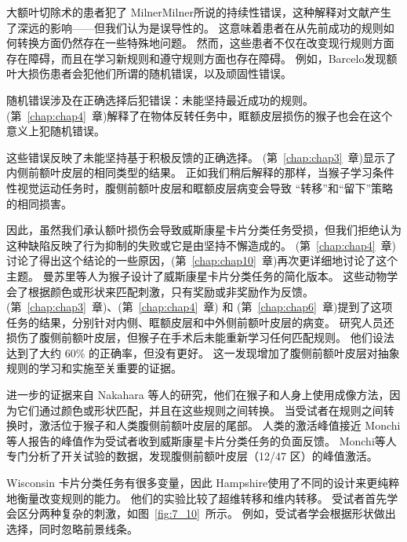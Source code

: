 大额叶切除术的患者犯了 MilnerMilner\cite{milner1963effects}所说的持续性错误，这种解释对文献产生了深远的影响——但我们认为是误导性的。 
这意味着患者在从先前成功的规则如何转换方面仍然存在一些特殊地问题。 
然而，这些患者不仅在改变现行规则方面存在障碍，而且在学习新规则和遵守规则方面也存在障碍。 
例如，Barcelo\cite{barcelo2002both}发现额叶大损伤患者会犯他们所谓的随机错误，以及顽固性错误。
\par


随机错误涉及在正确选择后犯错误：未能坚持最近成功的规则。 
(第~\ref{chap:chap4}~章)解释了在物体反转任务中，眶额皮层损伤的猴子也会在这个意义上犯随机错误\cite{rudebeck2008frontal}。
\par


这些错误反映了未能坚持基于积极反馈的正确选择。 (第~\ref{chap:chap3}~章)显示了内侧前额叶皮层的相同类型的结果。 
正如我们稍后解释的那样，当猴子学习条件性视觉运动任务时，腹侧前额叶皮层和眶额皮层病变会导致
“转移”和“留下”策略的相同损害\cite{bussey2001role}。
\par


因此，虽然我们承认额叶损伤会导致威斯康星卡片分类任务受损，但我们拒绝认为这种缺陷反映了行为抑制的失败或它是由坚持不懈造成的。 
(第~\ref{chap:chap4}~章)讨论了得出这个结论的一些原因，(第~\ref{chap:chap10}~章)再次更详细地讨论了这个主题。 
曼苏里等人\cite{mansouri2006prefrontal}为猴子设计了威斯康星卡片分类任务的简化版本。 
这些动物学会了根据颜色或形状来匹配刺激，只有奖励或非奖励作为反馈。 
(第~\ref{chap:chap3}~章)、(第~\ref{chap:chap4}~章) 和 (第~\ref{chap:chap6}~章)提到了这项任务的结果，分别针对内侧、眶额皮层和中外侧前额叶皮层的病变\cite{buckley2009dissociable}。
研究人员还损伤了腹侧前额叶皮层，但猴子在手术后未能重新学习任何匹配规则。
他们设法达到了大约 60\% 的正确率，但没有更好。
这一发现增加了腹侧前额叶皮层对抽象规则的学习和实施至关重要的证据。
\par


进一步的证据来自 Nakahara 等人的研究\cite{nakahara2002functional}，他们在猴子和人身上使用成像方法，因为它们通过颜色或形状匹配，并且在这些规则之间转换。 
当受试者在规则之间转换时，激活位于猴子和人类腹侧前额叶皮层的尾部。 
人类的激活峰值接近 Monchi 等人报告的峰值\cite{monchi2001wisconsin}作为受试者收到威斯康星卡片分类任务的负面反馈。
Monchi等人专门分析了开关试验的数据，发现腹侧前额叶皮层（12/47 区）的峰值激活。
\par


Wisconsin 卡片分类任务有很多变量，因此 Hampshire\cite{hampshire2006fractionating}使用了不同的设计来更纯粹地衡量改变规则的能力。 
他们的实验比较了超维转移和维内转移。 
受试者首先学会区分两种复杂的刺激，如图~\ref{fig:7_10}~所示。
例如，受试者学会根据形状做出选择，同时忽略前景线条。
\par


